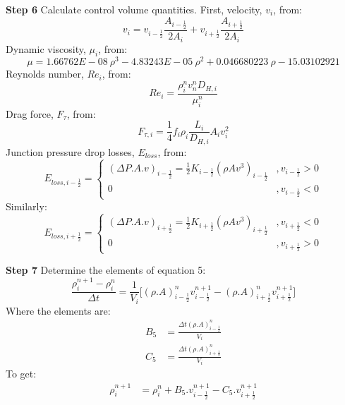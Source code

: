 \documentclass[11pt,letterpaper,titlepage]{article}
\newcommand{\half}{\frac{1}{2}}
\begin{document}
\vspace{0.5cm}\noindent
\textbf{Step 6}\newline
Calculate control volume quantities. First, velocity, $v_i$, from:
\begin{equation*}
v_i=v_{i-\half}\frac{A_{i-\half}}{2A_i} + v_{i+\half} \frac{A_{i+\half}}{2A_i}
\end{equation*}
Dynamic viscosity, $\mu_i$, from:
\begin{equation*}
\mu=1.66762E-08 \ \rho^3-4.83243E-05 \ \rho^2+0.046680223 \ \rho-15.03102921
\end{equation*}
Reynolds number, $Re_i$, from:
\begin{equation*}
Re_i=\frac{\rho_i^n v_n^n D_{H,i}}{\mu_i^n}
\end{equation*}
Drag force, $F_{\tau}$, from:
\begin{equation*}
F_{\tau,i}=\frac{1}{4} f_i \rho_i \frac{L_i}{D_{H,i}}A_i v_i^2 
\end{equation*}
Junction pressure drop losses, $E_{loss}$, from:
\begin{equation*}
E_{loss,i-\half}=
\begin{cases}
(\Delta P.A.v)_{i-\half} = \half  K_{i-\half} (\rho A v^3)_{i-\half}     &,v_{i-\half}>0 \\
0    &,v_{i-\half}<0
\end{cases}
\end{equation*}
\newline
\noindent Similarly:
\begin{equation*}
E_{loss,i+\half}=
\begin{cases}
(\Delta P.A.v)_{i+\half} = \half  K_{i+\half} (\rho A v^3)_{i+\half}     &,v_{i+\half}<0 \\
0    &,v_{i+\half}>0
\end{cases}
\end{equation*}


\vspace{0.5cm}\noindent
\textbf{Step 7}\newline
Determine the elements of equation 5:
\begin{equation*}
\frac{\rho_i^{n+1} - \rho_i^{n}}{\Delta t} = \frac{1}{V_i}\biggr[ (\rho.A)_{i-\half}^{n}v_{i-\half}^{n+1}-(\rho.A)_{i+\half}^{n} v_{i+\half}^{n+1} \biggr]
\end{equation*}
\newline
Where the elements are:
\begin{equation*}
\begin{aligned}
B_5&=\frac{\Delta t (\rho.A)_{i-\half}^{n}}{V_i}\\
C_5&=\frac{\Delta t (\rho.A)_{i+\half}^{n}}{V_i}
\end{aligned}
\end{equation*}
\newline
To get:
\begin{equation}
\begin{aligned}
\rho_i^{n+1}&=\rho_i^{n}+B_5.v_{i-\half}^{n+1} - C_5.v_{i+\half}^{n+1}\\
\end{aligned}
\end{equation}
\end{document}
